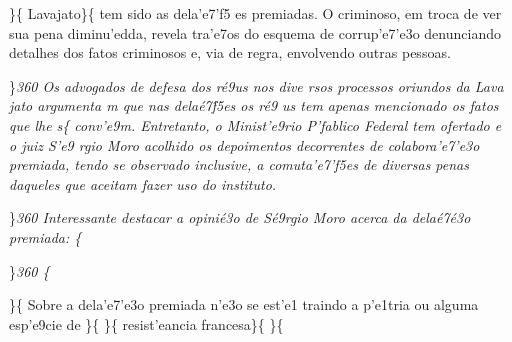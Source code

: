 \}\{\rtlch{}  \ltrch{}  Lavajato\}\{\rtlch{}
 \ltrch{}  tem sido as dela'e7'f5
es premiadas. O criminoso, em troca de ver sua pena diminu'edda, revela
tra'e7os do esquema de corrup'e7'e3o denunciando detalhes dos fatos
criminosos e, via de regra, envolvendo outras pessoas.
\par \}\pard \ltrpar\qj {}\sl360\widctlpar\wrapdefault\faauto{} {\rtlch{}  \ltrch{}  \tab }{\rtlch{}  \ltrch{}  Os advogados de }{\rtlch{}  
\ltrch{}  defesa dos r\'e9us nos dive}{\rtlch{}  \ltrch{}  rsos processos oriundos da }{\rtlch{}  \ltrch{}  Lava}{\rtlch{}  \ltrch{} 
 jato}{\rtlch{}  \ltrch{}   argumenta}{\rtlch{}  \ltrch{}  m}{\rtlch{}  \ltrch{}   que nas dela\'e7\'f5es os r\'e9
us tem apenas mencionado os fatos que lhe}{\rtlch{}  \ltrch{}  s}\{\rtlch{}
 \ltrch{}  conv'e9m. Entretanto,
o Minist'e9rio P'fablico Federal tem ofertado e o juiz S'e9 rgio Moro
acolhido os depoimentos decorrentes de colabora'e7'e3o premiada, tendo
se observado inclusive, a comuta'e7'f5es de diversas penas daqueles que
aceitam fazer uso do instituto.
\par \}\pard \ltrpar\qj {}\sl360\widctlpar\wrapdefault\faauto{} {\rtlch{}  \ltrch{}  Interessante destacar a opini\'e3o de S\'e9rgio Moro acerca da dela\'e7\'e3o premiada:
}\{\rtlch{}  \ltrch{} 
\par \}\pard \ltrpar\qj {}\sl360\widctlpar\wrapdefault\faauto{} \{\rtlch{}
 \ltrch{}  \par \}\{\rtlch{}
 \ltrch{}  Sobre a
dela'e7'e3o premiada n'e3o se est'e1 traindo a p'e1tria ou alguma
esp'e9cie de \}\{\rtlch{}  \ltrch{}
 \lquote \}\{ \rtlch{} 
\ltrch{}  resist'eancia
francesa\}\{\rtlch{}  \ltrch{}
 \rquote \}\{\rtlch{} 
